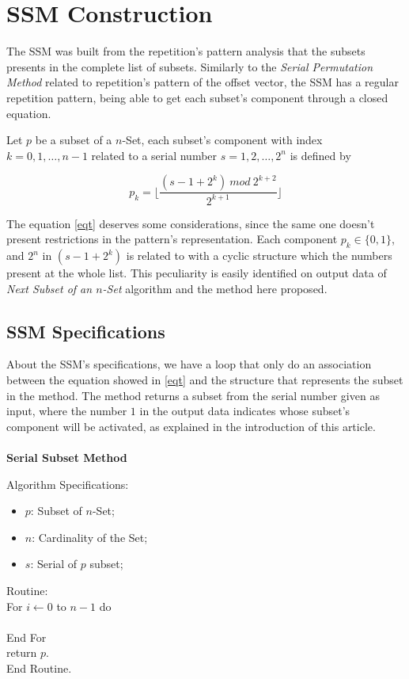\documentclass {amsart}
\begin{document}
\section*{SSM Construction}
The SSM was built from the repetition's pattern analysis that the subsets presents in the complete list of subsets. Similarly to the \emph{Serial Permutation Method}\cite{me} related to repetition's pattern of the offset vector, the SSM has a regular repetition pattern, being able to get each subset's component through a closed equation.

Let {$p$} be a subset of a {$n$}-Set, each subset's component with index {$k = 0,1,\ldots,n-1$} related to a serial number {$s = 1,2,\ldots,2^n$} is defined by

\begin{equation}    \label{eqt}
p_k = \displaystyle\biggl\lfloor\frac{(s-1 + 2^k) ~mod~
2^{k+2}}{2^{k+1}}\displaystyle\biggl\rfloor
\end{equation}

The equation \ref{eqt} deserves some considerations, since the same one doesn't present restrictions in the pattern's representation. Each component {$p_k \in \{0,1\}$}, and {$2^n$} in {$(s-1 + 2^k)$} is related to with a cyclic structure which the numbers present at the whole list. This peculiarity is easily identified on output data of \emph{Next Subset of an {$n$}-Set}\cite{wi} algorithm and the method here proposed.

\subsection*{SSM Specifications}
About the SSM's specifications, we have a loop that only do an association between the equation showed in \ref{eqt} and the structure that represents the subset in the method. The method returns a subset from the serial number given as input, where the number {$1$} in the output data indicates whose subset's component will be activated, as explained in the introduction of this article.\\\\
\textbf{Serial Subset Method}

Algorithm Specifications:
\begin{itemize}

\item {$p$}: Subset of {$n$}-Set;

\item {$n$}: Cardinality of the Set;

\item {$s$}: Serial of {$p$} subset;

\end{itemize}
Routine:\\
\indent For {$i \leftarrow 0$} to {$n-1$} do\\
\indent {}\\
\indent End For\\
return {$p$}.\\
End Routine.
\end{document}
